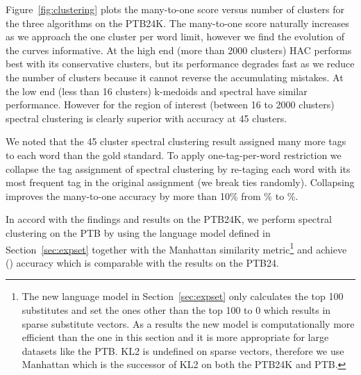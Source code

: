 Figure~\ref{fig:clustering} plots the many-to-one score versus number
of clusters for the three algorithms on the PTB24K.  The many-to-one
score naturally increases as we approach the one cluster per word
limit, however we find the evolution of the curves informative.  At
the high end (more than 2000 clusters) HAC performs best with its
conservative clusters, but its performance degrades fast as we reduce
the number of clusters because it cannot reverse the accumulating
mistakes.  At the low end (less than 16 clusters) k-medoids and
spectral have similar performance.  However for the region of interest
(between 16 to 2000 clusters) spectral clustering is clearly superior
with \spectralResult \mto accuracy at 45 clusters.

We noted that the 45 cluster spectral clustering result assigned many
more tags to each word than the gold standard.  To apply
one-tag-per-word restriction we collapse the tag assignment of
spectral clustering by re-taging each word with its most frequent tag
in the original assignment (we break ties randomly).  Collapsing
improves the many-to-one accuracy by more than 10\% from
\spectralResult\% to \collapseResult\%.

In accord with the findings and results on the PTB24K, we perform
spectral clustering on the PTB by using the language model defined in
Section~\ref{sec:expset} together with the Manhattan similarity
metric\footnote{The new language model in Section~\ref{sec:expset}
  only calculates the top 100 substitutes and set the ones other than
  the top 100 to 0 which results in sparse substitute vectors.  As a
  results the new model is computationally more efficient than the one
  in this section and it is more appropriate for large datasets like
  the PTB.  KL2 is undefined on sparse vectors, therefore we use
  Manhattan which is the successor of KL2 on both the PTB24K and PTB.}
and achieve \spectralResultPTB \mto (\collapseResultPTB \vm) accuracy
which is comparable with the results on the PTB24.




